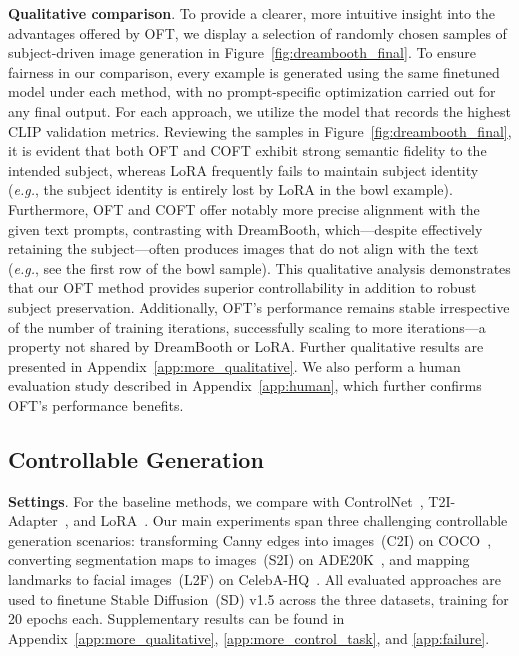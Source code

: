 \textbf{Qualitative comparison}. To provide a clearer, more intuitive insight into the advantages offered by OFT, we display a selection of randomly chosen samples of subject-driven image generation in Figure~\ref{fig:dreambooth_final}. To ensure fairness in our comparison, every example is generated using the same finetuned model under each method, with no prompt-specific optimization carried out for any final output. For each approach, we utilize the model that records the highest CLIP validation metrics. Reviewing the samples in Figure~\ref{fig:dreambooth_final}, it is evident that both OFT and COFT exhibit strong semantic fidelity to the intended subject, whereas LoRA frequently fails to maintain subject identity (\emph{e.g.}, the subject identity is entirely lost by LoRA in the bowl example). Furthermore, OFT and COFT offer notably more precise alignment with the given text prompts, contrasting with DreamBooth, which—despite effectively retaining the subject—often produces images that do not align with the text (\emph{e.g.}, see the first row of the bowl sample). This qualitative analysis demonstrates that our OFT method provides superior controllability in addition to robust subject preservation. Additionally, OFT's performance remains stable irrespective of the number of training iterations, successfully scaling to more iterations—a property not shared by DreamBooth or LoRA. Further qualitative results are presented in Appendix~\ref{app:more_qualitative}. We also perform a human evaluation study described in Appendix~\ref{app:human}, which further confirms OFT’s performance benefits.

\subsection{Controllable Generation}

\textbf{Settings}. For the baseline methods, we compare with ControlNet~\cite{zhang2023adding}, T2I-Adapter~\cite{mou2023t2i}, and LoRA~\cite{hulora2022}. Our main experiments span three challenging controllable generation scenarios: transforming Canny edges into images~(C2I) on COCO~\cite{lin2014microsoft}, converting segmentation maps to images~(S2I) on ADE20K~\cite{zhou2017scene}, and mapping landmarks to facial images~(L2F) on CelebA-HQ~\cite{karras2018progressive,xia2021tedigan}. All evaluated approaches are used to finetune Stable Diffusion~(SD) v1.5 across the three datasets, training for 20 epochs each. Supplementary results can be found in Appendix~\ref{app:more_qualitative}, \ref{app:more_control_task}, and \ref{app:failure}.

